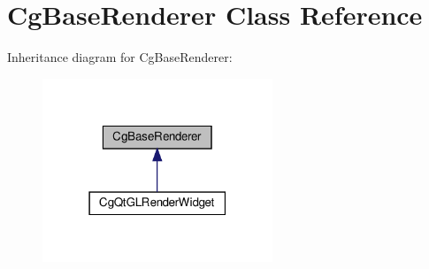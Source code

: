 \hypertarget{class_cg_base_renderer}{}\section{Cg\+Base\+Renderer Class Reference}
\label{class_cg_base_renderer}


Inheritance diagram for Cg\+Base\+Renderer\+:
\nopagebreak
\begin{figure}[H]
\begin{center}
\leavevmode
\includegraphics[width=195pt]{class_cg_base_renderer__inherit__graph}
\end{center}
\end{figure}
